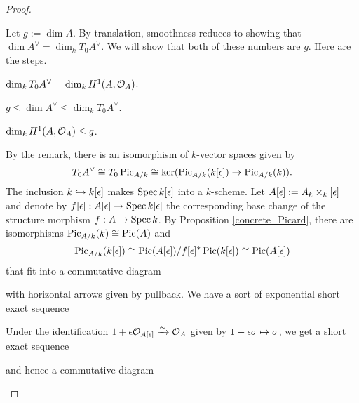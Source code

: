 \documentclass[11pt]{article}
\begin{document}
\begin{proof}
\begin{enum}{\roman}
\item Let $g:=\dim A$. By translation, smoothness reduces to showing that $\dim A^{\vee}=\dim_kT_0A^{\vee}$. We will show that both of these numbers are $g$. Here are the steps.
\begin{enum}{\arabic}
\item $\dim_kT_0A^{\vee}=\dim_kH^1(A,\O_A)$.
\item $g\leq\dim A^{\vee}\leq\dim_kT_0A^{\vee}$.
\item $\dim_kH^1(A,\O_A)\leq g$.
\end{enum}

By the remark, there is an isomorphism of $k$-vector spaces given by 
$$T_0A^{\vee}\iso T_0\Pic_{A/k}\iso\ker(\Pic_{A/k}(k[\eps])\to\Pic_{A/k}(k)).$$
The inclusion $k\inj k[\eps]$ makes $\Spec k[\eps]$ into a $k$-scheme. Let $A[\eps]:=A_k\times_k[\eps]$ and denote by $f[\eps]: A[\eps]\to\Spec k[\eps]$ the corresponding base change of the structure morphism $f: A\to\Spec k$. By Proposition \ref{concrete_Picard}, there are isomorphisms $\Pic_{A/k}(k)\iso\Pic(A)$ and 
$$\Pic_{A/k}(k[\eps])\iso\Pic(A[\eps])/f[\eps]^*\Pic(k[\eps])\iso\Pic(A[\eps])$$
that fit into a commutative diagram
\begin{center}
\end{center}
with horizontal arrows given by pullback. We have a sort of exponential short exact sequence 
\begin{center}
\end{center}
Under the identification $1+\eps\O_{A{[}\eps{]}}\xto{\sim}\O_A$ given by $1+\eps\sigma\mapsto\sigma$, we get a short exact sequence 
\begin{center}
\end{center}
and hence a commutative diagram
\begin{center}
\begin{tikzcd}

\end{tikzcd}
\end{center}
\end{enum}
\end{proof}
\end{document}
